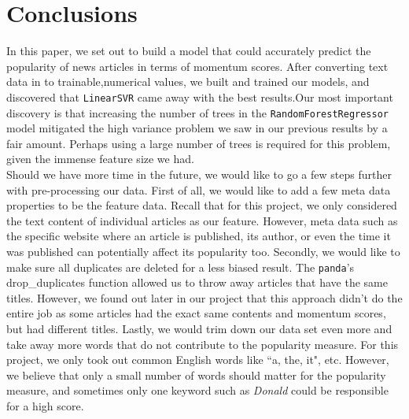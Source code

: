 
\section{Conclusions}
\label{sec:concl}

In this paper, we set out to build a model that could accurately predict the popularity of news articles in terms of momentum scores. After converting text data in to trainable,numerical values, we built and trained our models, and  discovered that \texttt{LinearSVR} came away with the best results.Our most important discovery is that increasing the number of trees in the \texttt{RandomForestRegressor} model mitigated the high variance problem we saw in our previous results by a fair amount. Perhaps using a large number of trees is required for this problem, given the immense feature size we had.\\


Should we have more time in the future, we would like to go a few steps further with pre-processing our data. First of all, we would like to add a few meta data properties to be the feature data. Recall that for this project, we only considered the text content of individual articles as our feature. However, meta data such as the specific website where an article is published, its author, or even the time it was published can potentially affect its popularity too. Secondly, we would like to make sure all duplicates are deleted for a less biased result. The \texttt{panda}'s drop\_duplicates function allowed us to throw away articles that have the same titles. However, we found out later in our project that this approach didn't do the entire job as some articles had the exact same contents and momentum scores, but had different titles. Lastly, we would trim down our data set even more and take away more words that do not contribute to the popularity measure. For this project, we only took out common English words like ``a, the, it", etc. However, we believe that only a small number of words should matter for the popularity measure, and sometimes only one keyword such as \textit{Donald} could be responsible for a high score. \\
